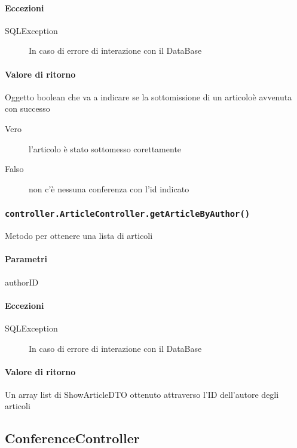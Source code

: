 \paragraph{Eccezioni}
\begin{description}
\item[SQLException] In caso di errore di interazione con il DataBase
\end{description}
\paragraph{Valore di ritorno}
Oggetto boolean che va a indicare se la sottomissione di un articoloè avvenuta con successo
\begin{description}
\item [Vero] l'articolo è stato sottomesso corettamente
\item [Falso] non c'è nessuna conferenza con l'id indicato
\end{description}

\subsubsection{\texttt{controller.ArticleController.getArticleByAuthor()}}
Metodo per ottenere una lista di articoli
\paragraph{Parametri}
\begin{description}
\item authorID
\end{description}
\paragraph{Eccezioni}
\begin{description}
\item[SQLException] In caso di errore di interazione con il DataBase
\end{description}
\paragraph{Valore di ritorno}
Un array list di ShowArticleDTO ottenuto attraverso l'ID dell'autore degli articoli



\subsection{ConferenceController}

